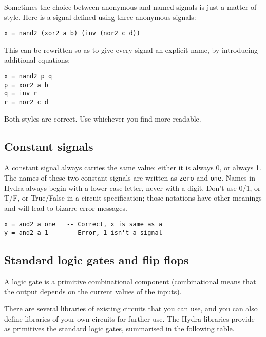 \documentclass[11pt]{article}
\begin{document}
Sometimes the choice between anonymous and named signals is just a
matter of style.  Here is a signal defined using three anonymous
signals:

\begin{verbatim}
x = nand2 (xor2 a b) (inv (nor2 c d))
\end{verbatim}

This can be rewritten so as to give every signal an explicit name, by
introducing additional equations:

\begin{verbatim}
x = nand2 p q
p = xor2 a b
q = inv r
r = nor2 c d
\end{verbatim}

Both styles are correct.  Use whichever you find more readable.

\subsection{Constant signals}
\label{sec:org34eadef}

A constant signal always carries the same value: either it is always
0, or always 1.  The names of these two constant signals are written
as \texttt{zero} and \texttt{one}.  Names in Hydra always begin with a lower case
letter, never with a digit.  Don't use 0/1, or T/F, or True/False in a
circuit specification; those notations have other meanings and will
lead to bizarre error messages.

\begin{verbatim}
x = and2 a one   -- Correct, x is same as a
y = and2 a 1     -- Error, 1 isn't a signal
\end{verbatim}

\subsection{Standard logic gates and flip flops}
\label{sec:org5b8920d}

A logic gate is a primitive combinational component (combinational
means that the output depends on the current values of the inputs).

There are several libraries of existing circuits that you can use, and
you can also define libraries of your own circuits for further use.
The Hydra libraries provide as primitives the standard logic gates,
summarised in the following table.
\end{document}
